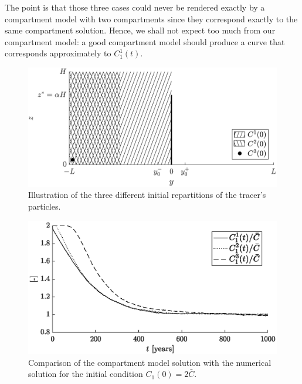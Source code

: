 The point is that those three cases could never be rendered exactly by a compartment model with two compartments since they correspond exactly to the same compartment solution. Hence, we shall not expect too much from our compartment model: a good compartment model should produce a curve that corresponds approximately to $C_1^1(t)$.
\begin{figure}[!htp]
	\centering
	\includegraphics[width = \textwidth]{fig/problem2box/CI_init.eps}
	\caption{Illustration of the three different initial repartitions of the tracer's particles.}
	\label{fig:CI_init}
\end{figure}

\begin{figure}[!htp]
	\centering
	\includegraphics[width=\textwidth]{fig/problem2box/CI_1000years.eps}
	\caption{Comparison of the compartment model solution with the numerical solution for the initial condition $C_1(0) = 2\bar C$.}
	\label{fig:CI_evol}
\end{figure}

